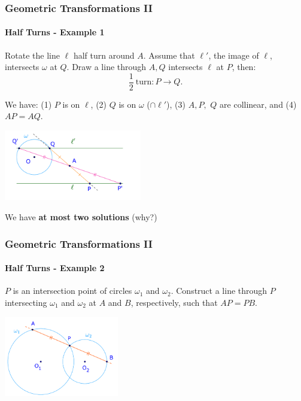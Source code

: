 \documentclass[8pt,xcolor=table,dvipsnames]{beamer}
\begin{document}
\begin{frame}[t]
    \frametitle{Geometric Transformations II}
    \framesubtitle{Half Turns - Example 1}
    Rotate the line $\ell$ half turn around $A$.
    Assume that $\ell'$, the image of $\ell$, intersects $\omega$ at $Q$.
    Draw a line through $A, Q$ intersects $\ell$ at $P$, then:
    \[
        \frac{1}{2}\ \text{turn}: P \rightarrow Q.
    \]

    \bigbreak
    We have: (1) $P$ is on $\ell$, (2) $Q$ is on $\omega$ ($\cap \ell'$), (3) $A, P,$ $Q$ are collinear, and 
    (4) $AP = AQ$.

    \begin{center}
        \includegraphics[width=6cm]{./svg/pdf/rotation-p8b.pdf}
    \end{center}

    We have \textbf{at most two solutions} (why?)
\end{frame}

\begin{frame}[t]
    \frametitle{Geometric Transformations II}
    \framesubtitle{Half Turns - Example 2}
    \begin{example}
        $P$ is an intersection point of circles $\omega_1$ and $\omega_2$.
        Construct a line through $P$ intersecting $\omega_1$ and $\omega_2$ at $A$ and $B$, respectively,
        such that $AP = PB.$
    \end{example}

    \bigbreak
    \begin{center}
        \includegraphics[width=5cm]{./svg/pdf/rotation-1a.pdf}
    \end{center}
\end{frame}
\end{document}
